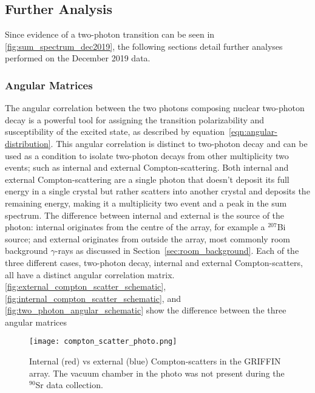 \documentclass[cnatzke_thesis_proposal.tex]{subfiles}
\begin{document}
\subsection{Further Analysis}
\label{sec:further_analysis}
Since evidence of a two-photon transition can be seen in \ref{fig:sum_spectrum_dec2019}, the following sections detail further analyses performed on the December 2019 data.

\subsubsection{Angular Matrices}
\label{sec:angular_matrices}

The angular correlation between the two photons composing nuclear two-photon decay is a powerful tool for assigning the transition polarizability and susceptibility of the excited state, as described by equation~\ref{eqn:angular-distribution}.
This angular correlation is distinct to two-photon decay and can be used as a condition to isolate two-photon decays from other multiplicity two events; such as internal and external Compton-scattering.
Both internal and external Compton-scattering are a single photon that doesn't deposit its full energy in a single crystal but rather scatters into another crystal and deposits the remaining energy, making it a multiplicity two event and a peak in the sum spectrum.
The difference between internal and external is the source of the photon: internal originates from the centre of the array, for example a $^{207}$Bi source; and external originates from outside the array, most commonly room background $\gamma$-rays as discussed in Section~\ref{sec:room_background}.
Each of the three different cases, two-photon decay, internal and external Compton-scatters, all have a distinct angular correlation matrix.
\ref{fig:external_compton_scatter_schematic}, \ref{fig:internal_compton_scatter_schematic}, and \ref{fig:two_photon_angular_schematic} show the difference between the three angular matrices

\begin{figure}[htbp]
    \centering
    \texttt{[image: compton\_scatter\_photo.png]}
    \caption{Internal (red) vs external (blue) Compton-scatters in the GRIFFIN array. The vacuum chamber in the photo was not present during the $^{90}$Sr data collection.}
    \label{fig:compton_scatter_griffin_photo}
\end{figure}
\end{document}
